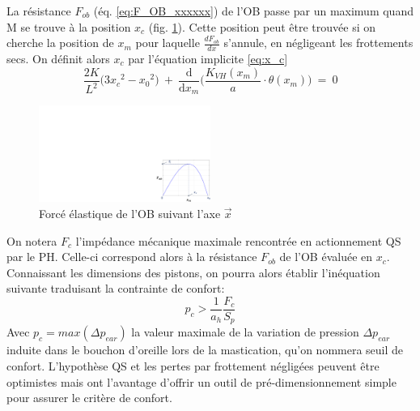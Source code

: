 La résistance $F_{ob}$ (éq. \ref{eq:F_OB_xxxxxx}) de l'OB passe par un maximum quand M se trouve à la position $x_c$ (fig. \ref{fig:x_crit}). Cette position peut être trouvée si on cherche la position de $x_m$ pour laquelle $\frac{dF_{ob}}{dx}$ s'annule, en négligeant les frottements secs. On définit alors $x_c$ par l'équation implicite \ref{eq:x_c} 
\begin{equation}
\dfrac{2K}{L^2}\biggl(3{x_c}^2-{x_0}^2\biggr) \ 
+\ \dfrac{\text{d}}{\text{d} x_m} \biggl(\frac{K_{VH}(x_m)}{a}\cdot \theta({x_m}) \biggr)
\ =\ 0
	\label{eq:x_c}
\end{equation} 
\begin{figure}[!htbp]
	\begin{center}
		\captionsetup{justification=centering}
		\includegraphics[trim={23cm 0cm 0cm 10.5cm},clip, width=0.5\textwidth]{../Chap2/Figure/x_crit.pdf}
		\caption{Forcé élastique de l'OB suivant l'axe $\vec{x}$}
		\label{fig:x_crit}
	\end{center}
\end{figure}
On notera $F_c$ l'impédance mécanique maximale rencontrée en actionnement QS par le PH. Celle-ci correspond alors à la résistance $F_{ob}$ de l'OB évaluée en $x_c$.\\
Connaissant les dimensions des pistons, on pourra alors établir l'inéquation suivante traduisant la contrainte de confort:
\begin{equation}
p_c > \frac{1}{a_h} \frac{F_c}{S_p}
\label{eq:critere_confort}
\end{equation}
Avec $p_c = max(\Delta p_{ear})$ la valeur maximale de la variation de pression $\Delta p_{ear}$ induite dans le bouchon d'oreille lors de la mastication, qu'on nommera seuil de confort. L'hypothèse QS et les pertes par frottement négligées peuvent être optimistes mais ont l'avantage d'offrir un outil de 
pré-dimensionnement simple pour assurer le critère de confort.

